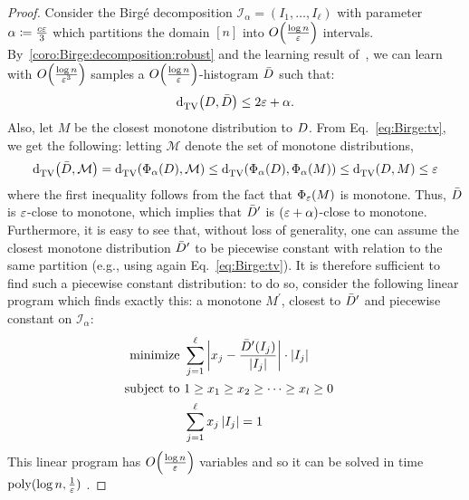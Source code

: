 \begin{proof}  Consider the Birg\'e decomposition $\mathcal{I}_\alpha=(I_1,\dots,I_\ell)$ with parameter $\alpha\coloneqq\frac{c \varepsilon}{3}$ which partitions the domain $[n]$ into $\bigO{\frac{\log n}{\eps}}$ intervals.
  By~\autoref{coro:Birge:decomposition:robust} and the learning result of~\cite{Birge:87}, we can learn with $\bigO{\frac{\log n}{\eps^3}}$ samples a $\bigO{\frac{\log n}{\eps}}$-histogram $\bar{D}$ such that:
   \begin{equation}
   {\operatorname{d}_{\textrm{TV}}^{}\!\left({\ensuremath{D}, \bar{\ensuremath{D}}}\right)}\leq 2\varepsilon+\alpha.
\end{equation}    
  Also, let $M$ be the closest monotone distribution to $D$. From Eq.~\eqref{eq:Birge:tv}, we get the following: letting $\mathcal{M}$ denote the set of monotone distributions,   
 \begin{equation}
 {\operatorname{d}_{\textrm{TV}}^{}\!\left({\bar{\ensuremath{D}}, \mathcal{M}}\right)}={\operatorname{d}_{\textrm{TV}}^{}\!\left({\Phi_{\alpha}(D), \mathcal{M}}\right)}\leq {\operatorname{d}_{\textrm{TV}}^{}\!\left({\Phi_{\alpha}(\ensuremath{D}), \Phi_{\alpha}(M)}\right)}\leq {\operatorname{d}_{\textrm{TV}}^{}\!\left({\ensuremath{D}, M}\right)}\leq \varepsilon 
 \end{equation}
  where the first inequality follows from the fact that $\Phi_{\varepsilon}(M)$ is monotone. Thus, $\bar{D}$ is $\varepsilon$-close to monotone, which implies that $\bar{D}^\prime$ is $(\varepsilon+\alpha)$-close to monotone. Furthermore, it is easy to see that, without loss of generality, one can assume the closest monotone distribution $\bar{D}^\prime$ to be piecewise constant with relation to the same partition (e.g., using again Eq.~\eqref{eq:Birge:tv}). It is therefore sufficient to find such a piecewise constant distribution: to do so, consider the following linear program which finds exactly this: a monotone $M^\prime$, closest to $\bar{D}^\prime$ and piecewise constant on $\mathcal{I}_\alpha$:
\begin{alignat*}{2}
    \text{minimize }   & \sum_{j=1}^\ell \left\lvert  x_j - \frac{\bar{D}^\prime(I_j)}{\left\lvert  I_j  \right\rvert}  \right\rvert \cdot \left\lvert  I_j  \right\rvert    \\
    \text{subject to } & 1\geq x_1\geq x_2 \geq \dots \geq x_l \geq 0 & \\
                       &  \sum_{j=1}^\ell x_j\left\lvert  I_j  \right\rvert =1
  \end{alignat*}  
\noindent This linear program has $\bigO{\frac{\log n}{\eps}}$ variables and so it can be solved in time $\operatorname*{poly}(\log n,\frac{1}{\varepsilon})$ .  


\end{proof}
